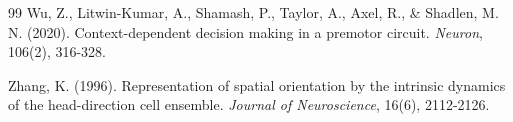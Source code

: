 \documentclass[11pt,a4paper]{article}
\begin{document}
\begin{thebibliography}{99}
Wu, Z., Litwin-Kumar, A., Shamash, P., Taylor, A., Axel, R., \& Shadlen, M. N. (2020). Context-dependent decision making in a premotor circuit. \textit{Neuron}, 106(2), 316-328.

Zhang, K. (1996). Representation of spatial orientation by the intrinsic dynamics of the head-direction cell ensemble. \textit{Journal of Neuroscience}, 16(6), 2112-2126.

\end{thebibliography}
\end{document}

